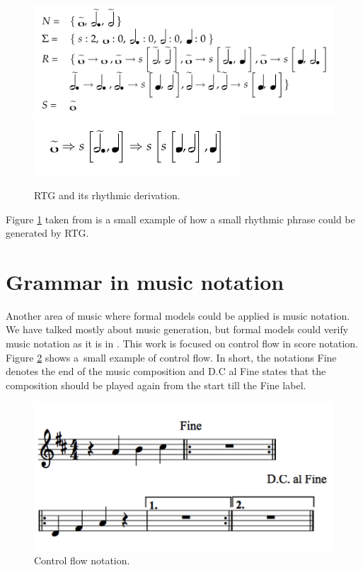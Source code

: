 \begin{figure}[H]
\centering
\hfill
\includegraphics[scale=0.5]{obrazky-figures/Rhythmicafrica.png}
\hfill
\includegraphics[scale=0.5]{obrazky-figures/Rhythmicafrica1.png}
\hfill
\caption{RTG and its rhythmic derivation.}
\label{africartg}
\end{figure}

Figure \ref{africartg} taken from \cite{africathesis} is a small example of how a small rhythmic phrase could be generated by RTG.

\section{Grammar in music notation}
Another area of music where formal models could be applied is music notation. We have talked mostly about music generation, but formal models could verify music notation as it is in \cite{controlflow}. This work is focused on control flow in score notation. Figure \ref{fig:controlflow} shows a~small example of control flow. In short, the notations Fine denotes the end of the music composition and D.C al Fine states that the composition should be played again from the start till the Fine label.

\begin{figure}[H]
    \centering
    \includegraphics[scale=0.3]{obrazky-figures/notation.png}
    \caption{Control flow notation.}
    \label{fig:controlflow}
\end{figure}

